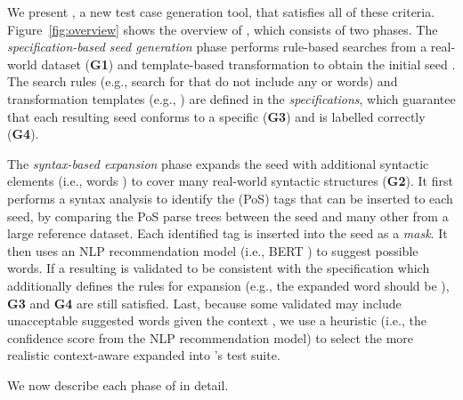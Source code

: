 We present \tool{}, a new \lc test case generation
tool, that satisfies all of these criteria.  
Figure~\ref{fig:overview} shows the overview of \tool{}, which
consists of two phases.  The \emph{specification-based seed
  generation} phase performs rule-based searches from a real-world
dataset ({\bf G1}) and template-based transformation to obtain the
initial seed \sents.  The search rules (e.g., search for \neu
\sents that do not include any \pstv or \ngtv words) and
transformation templates (e.g.,  ) are defined in the \emph{\lc
  specifications}, which guarantee that each resulting seed conforms
to a specific \lc ({\bf G3}) and is labelled
correctly ({\bf G4}).

The \emph{syntax-based \sent expansion} phase expands the seed
\sents with additional syntactic elements (i.e., words
) to cover many real-world
syntactic structures ({\bf G2}). It first performs a syntax analysis
to identify the \pos (PoS) tags that can be inserted to each
seed, by comparing the PoS parse trees between the seed \sent and
many other \sents from a large reference dataset. Each identified
tag is inserted into the seed as a \emph{mask}. It then uses an NLP
recommendation model (i.e., BERT \cite{}) to suggest possible
words. If a resulting \sent is validated to be consistent with the
specification which additionally defines the rules for expansion
(e.g., the expanded word should be \neu), {\bf G3} and {\bf G4} are
still satisfied.  Last, because some validated \sents may include
unacceptable suggested words given the context  , we use a heuristic (i.e., the
confidence score from the NLP recommendation model) to select the more
realistic context-aware expanded \sents into \tool{}'s test suite.

We now describe each phase of \tool{} in detail.


